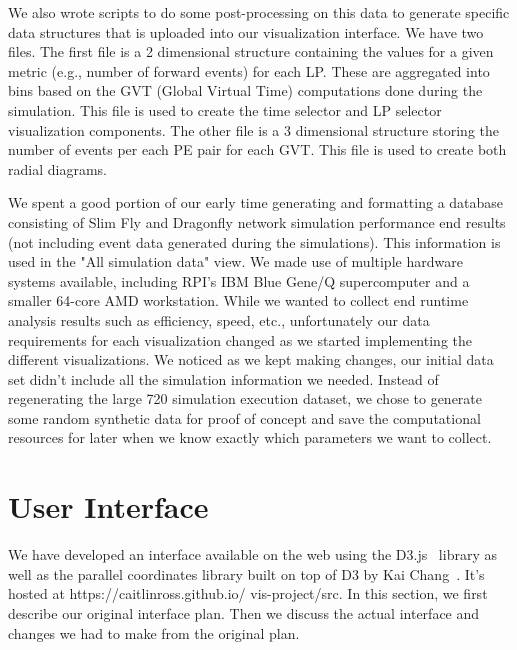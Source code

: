 \documentclass{acm_proc_article-sp}
\begin{document}
We also wrote scripts to do some post-processing on this data to generate specific data structures that is uploaded into our visualization interface.  We have two files. The first file is a 2 dimensional structure containing the values for a given metric (e.g., number of forward events) for each LP. These are aggregated into bins based on the GVT (Global Virtual Time) computations done during the simulation.  This file is used to create the time selector and LP selector visualization components. The other file is a 3 dimensional structure storing the number of events per each PE pair for each GVT. This file is used to create both radial diagrams.



We spent a good portion of our early time generating and formatting a database consisting of Slim Fly and Dragonfly network simulation performance end results (not including event data generated during the simulations). This information is used in the "All simulation data" view. We made use of multiple hardware systems available, including RPI's IBM Blue Gene/Q supercomputer and a smaller 64-core AMD workstation. While we wanted to collect end runtime analysis results such as efficiency, speed, etc., unfortunately our data requirements for each visualization changed as we started implementing the different visualizations. We noticed as we kept making changes, our initial data set didn't include all the simulation information we needed. Instead of regenerating the large 720 simulation execution dataset, we chose to generate some random synthetic data for proof of concept and save the computational resources for later when we know exactly which parameters we want to collect. 


\section{User Interface}
We have developed an interface available on the web using the D3.js~\cite{d3} library as well as the parallel coordinates library built on top of D3 by Kai Chang~\cite{chang}.  It's hosted at https://caitlinross.github.io/ vis-project/src.  In this section, we first describe our original interface plan.  Then we discuss the actual interface and changes we had to make from the original plan.  
\end{document}
